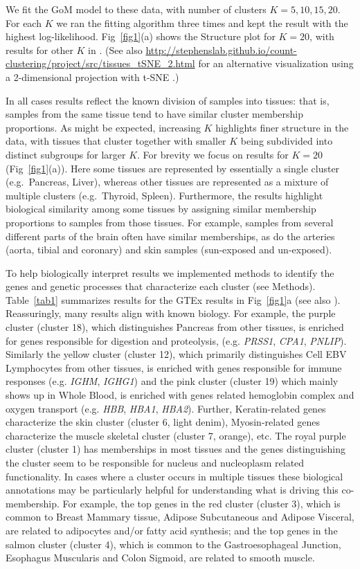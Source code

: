\documentclass[10pt,letterpaper]{article}
\begin{document}
We fit the GoM model to these data, with number of clusters $K=5,10,15,20$. For each $K$ we ran the fitting algorithm three times and
kept the result with the highest log-likelihood. Fig~\ref{fig1}(a) shows the Structure plot for $K=20$, with results for other $K$ in . (See also \url{http://stephenslab.github.io/count-clustering/project/src/tissues_tSNE_2.html} for
an alternative visualization using a 2-dimensional projection with t-SNE \cite{Maaten2008, Maaten2014}.)

In all cases results reflect the known division of samples into tissues: that is, samples from the same tissue tend to have similar cluster membership proportions. As might be expected, increasing $K$ highlights finer structure in the data, with tissues that cluster together with smaller $K$ being subdivided into distinct subgroups for larger $K$. For brevity we focus on results for $K=20$ (Fig~\ref{fig1}(a)). Here some tissues are represented by essentially a single cluster (e.g.~Pancreas, Liver), whereas other tissues are represented as a mixture of multiple clusters (e.g.~Thyroid, Spleen). Furthermore, the results highlight biological similarity among some tissues by assigning similar membership proportions to samples from those tissues.  For example, samples from several different parts of the brain often have similar memberships, as do the arteries (aorta, tibial and coronary) and skin samples (sun-exposed and un-exposed).

To help biologically interpret results we implemented methods to identify the genes and genetic processes that characterize each cluster (see Methods). Table~\ref{tab1} summarizes results for the GTEx results in Fig~\ref{fig1}a (see also ). Reassuringly, many results align with known biology. For example,  the purple cluster (cluster 18), which distinguishes Pancreas from other tissues, is enriched for genes responsible for digestion and proteolysis, (e.g. \textit{PRSS1}, \textit{CPA1}, \textit{PNLIP}). Similarly the yellow cluster (cluster 12), which primarily distinguishes Cell EBV Lymphocytes from other tissues, is enriched with genes responsible for immune responses (e.g. \textit{IGHM}, \textit{IGHG1}) and the pink cluster (cluster 19) which mainly shows up in Whole Blood, is enriched with genes related hemoglobin complex and oxygen transport (e.g. \textit{HBB}, \textit{HBA1}, \textit{HBA2}). Further, Keratin-related genes characterize the skin cluster (cluster 6, light denim), Myosin-related genes characterize the muscle skeletal cluster (cluster 7, orange), etc. The royal purple cluster (cluster 1) has memberships in most tissues and the genes distinguishing the cluster seem to be responsible for  nucleus and nucleoplasm related functionality. In cases where a cluster occurs in multiple tissues these biological annotations may be particularly helpful for understanding what is driving this co-membership. For example, the top genes in the red cluster (cluster 3), which is common to Breast Mammary tissue, Adipose Subcutaneous and Adipose Visceral, are related to adipocytes and/or fatty acid synthesis; and the top genes in the salmon cluster (cluster 4), which is common to the Gastroesophageal Junction, Esophagus Muscularis and Colon Sigmoid, are related to smooth muscle.
\end{document}
